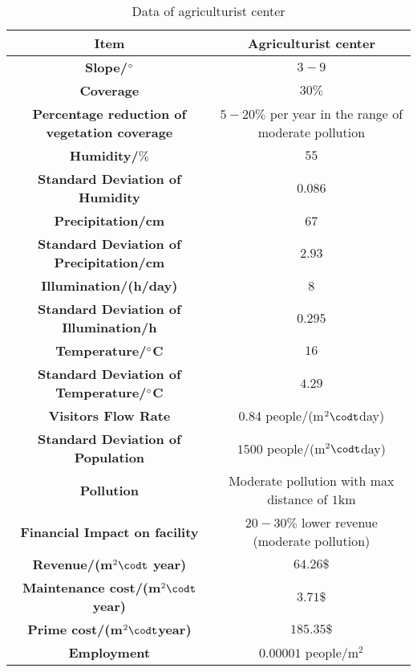 \documentclass[./main.tex]{subfiles}
\begin{document}
    \begin{table}[H]
        \caption{Data of agriculturist center}
        \centering
        \begin{tabular}{c c}
        \toprule
        \textbf{Item} & \textbf{Agriculturist center} \\[0.25cm]
        \midrule
        \textbf{Slope/$\degree$} & $3-9$ \\[0.25cm]
        \textbf{Coverage} & $30\%$ \\[0.25cm]
        \textbf{Percentage reduction of vegetation coverage} & $5-20\%$ per year in the range of moderate
    pollution \\[0.25cm]
        \textbf{Humidity/$\%$} & $55$ \\[0.25cm]
        \textbf{Standard Deviation of Humidity} & $0.086$ \\[0.25cm]
        \textbf{Precipitation/cm} & 67 \\[0.25cm]
        \textbf{Standard Deviation of Precipitation/cm} & $2.93$ \\[0.25cm]
        \textbf{Illumination/(h/day)} & 8 \\[0.25cm]
        \textbf{Standard Deviation of Illumination/h} & $0.295$ \\[0.25cm]
        \textbf{Temperature/$\degree$C} & $16$ \\[0.25cm]
        \textbf{Standard Deviation of Temperature/$\degree$C} & $4.29$ \\[0.25cm]
        \textbf{Visitors Flow Rate} & 0.84 people/(m$^2 \codt$day) \\[0.25cm]
        \textbf{Standard Deviation of Population} & $1500$ people/(m$^2 \codt$day) \\[0.25cm]
        \textbf{Pollution} & Moderate pollution with max distance of $1$km \\[0.25cm]
        \textbf{Financial Impact on facility} & $20-30\%$ lower revenue (moderate pollution) \\[0.25cm]
        \textbf{Revenue/(m$^2 \codt$ year)} & $64.26\$$ \\[0.25cm]
        \textbf{Maintenance cost/(m$^2 \codt$year)} & $3.71\$$ \\[0.25cm]
        \textbf{Prime cost/(m$^2 \codt$year)} & $185.35\$$\\[0.25cm]
        \textbf{Employment} & $0.00001$ people/m$^2$ \\[0.25cm]
        \bottomrule
        \end{tabular}
    \end{table}
\end{document}
